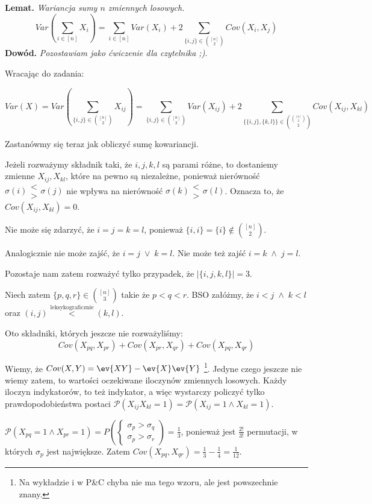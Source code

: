 \textbf{Lemat.} \textit{Wariancja sumy \(n\) zmiennych losowych.}
\[
	Var\left(\sum_{i \in [n]} X_{i}\right) = \sum_{i \in [n]} Var(X_i) + 2 \sum_{\{i, j\} \in \binom{[n]}{2}} Cov(X_i, X_j)
\]
\textbf{Dowód.} \textit{Pozostawiam jako ćwiczenie dla czytelnika ;).}

Wracając do zadania:

\[
	Var(X) = Var\left(\sum_{\{i,j\} \in \binom{[n]}{2}} X_{ij}\right) = \sum_{\{i,j\} \in \binom{[n]}{2}} Var(X_{ij}) + 2 \sum_{\{\{i,j\}, \{k,l\}\} \in \binom{\binom{[n]}{2}}{2}} Cov(X_{ij}, X_{kl})
\]

Zastanówmy się teraz jak obliczyć sumę kowariancji.

Jeżeli rozważymy składnik taki, że \(i, j, k, l\) są parami różne, to dostaniemy zmienne \(X_{ij}, X_{kl}\), które na pewno są niezależne, ponieważ nierówność \(\sigma(i) \substack{<\\ >} \sigma(j)\) nie wpływa na nierówność \(\sigma(k) \substack{<\\ >} \sigma(l)\). Oznacza to, że \(Cov(X_{ij}, X_{kl}) = 0\).

Nie może się zdarzyć, że \(i = j = k = l\), ponieważ \(\{i, i\} = \{i\} \not \in \binom{[n]}{2}\).

Analogicznie nie może zajść, że \(i = j \; \lor \; k = l\). Nie może też zajść \(i = k \; \land \; j = l\).

Pozostaje nam zatem rozważyć tylko przypadek, że \(|\{i, j, k, l\}| = 3\).

Niech zatem \(\{p, q, r\} \in \binom{[n]}{3}\) takie że \(p < q < r\). BSO załóżmy, że \(i < j \; \land \; k < l\) oraz \((i, j) \overset{\text{leksykograficznie}}{<} (k, l)\).

Oto składniki, których jeszcze nie rozważyliśmy:
\[
	Cov(X_{pq}, X_{pr}) + Cov(X_{pr}, X_{qr}) + Cov(X_{pq}, X_{qr})
\]

Wiemy, że \(Cov(X, Y) = \ev{XY} - \ev{X}\ev{Y}\) \footnote{Na wykładzie i w P\&C chyba nie ma tego wzoru, ale jest powszechnie znany.}. Jedyne czego jeszcze nie wiemy zatem, to wartości oczekiwane iloczynów zmiennych losowych. Każdy iloczyn indykatorów, to też indykator, a więc wystarczy policzyć tylko prawdopodobieństwa postaci \(\mathcal{P}(X_{ij}X_{kl} = 1) = \mathcal{P}(X_{ij} = 1 \land X_{kl} = 1)\).

\(\mathcal{P}(X_{pq} = 1 \land X_{pr} = 1) = P\left(\left\{\substack{\sigma_p > \sigma_q\\ \sigma_p > \sigma_r} \right. \right) = \frac{1}{3}\), ponieważ jest \(\frac{2!}{3!}\) permutacji, w których \(\sigma_p\) jest największe. Zatem \(Cov(X_{pq}, X_{qr}) = \frac{1}{3} - \frac{1}{4} = \frac{1}{12}\).

